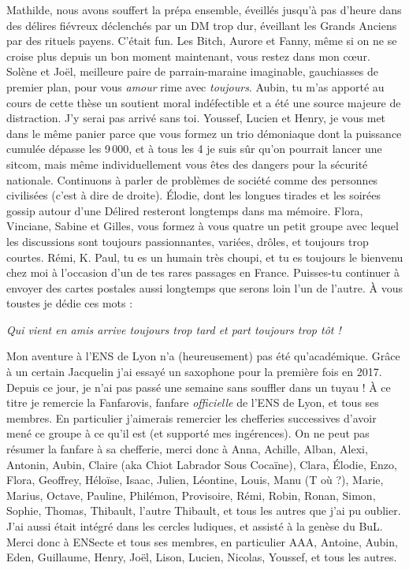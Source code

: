 Mathilde, nous avons souffert la prépa ensemble, éveillés jusqu'à pas d'heure dans des délires fiévreux déclenchés par un DM trop dur, éveillant les Grands Anciens par des rituels payens. C'était fun.
Les Bitch, Aurore et Fanny, même si on ne se croise plus depuis un bon moment maintenant, vous restez dans mon cœur.
Solène et Joël, meilleure paire de parrain-maraine imaginable, gauchiasses de premier plan, pour vous \textit{amour} rime avec \textit{toujours}.
Aubin, tu m'as apporté au cours de cette thèse un soutient moral indéfectible et a été une source majeure de distraction. J'y serai pas arrivé sans toi.
Youssef, Lucien et Henry, je vous met dans le même panier parce que vous formez un trio démoniaque dont la puissance cumulée dépasse les 9\,000, et à tous les 4 je suis sûr qu'on pourrait lancer une sitcom, mais même individuellement vous êtes des dangers pour la sécurité nationale. Continuons à parler de problèmes de société comme des personnes civilisées (c'est à dire de droite).
Élodie, dont les longues tirades et les soirées gossip autour d'une Délired resteront longtemps dans ma mémoire.
Flora, Vinciane, Sabine et Gilles, vous formez à vous quatre un petit groupe avec lequel les discussions sont toujours passionnantes, variées, drôles, et toujours trop courtes.
Rémi, K.
Paul, tu es un humain très choupi, et tu es toujours le bienvenu chez moi à l'occasion d'un de tes rares passages en France. Puisses-tu continuer à envoyer des cartes postales aussi longtemps que serons loin l'un de l'autre. À vous toustes je dédie ces mots :

\begin{flushright}
\textit{Qui vient en amis arrive toujours trop tard et part toujours trop tôt !}
\end{flushright}



\vskip 1cm


Mon aventure à l'ENS de Lyon n'a (heureusement) pas été qu'académique. Grâce à un certain Jacquelin j'ai essayé un saxophone pour la première fois en 2017. Depuis ce jour, je n'ai pas passé une semaine sans souffler dans un tuyau ! À ce titre je remercie la Fanfarovis, fanfare \textit{officielle} de l'ENS de Lyon, et tous ses membres. En particulier j'aimerais remercier les chefferies successives d'avoir mené ce groupe à ce qu'il est (et supporté mes ingérences). On ne peut pas résumer la fanfare à sa chefferie, merci donc à
Anna,
Achille,
Alban,
Alexi,
Antonin,
Aubin,
Claire (aka Chiot Labrador Sous Cocaïne),
Clara,
Élodie,
Enzo,
Flora,
Geoffrey,
Héloïse,
Isaac,
Julien,
Léontine,
Louis,
Manu (T où ?),
Marie,
Marius,
Octave,
Pauline,
Philémon,
Provisoire,
Rémi,
Robin,
Ronan,
Simon,
Sophie,
Thomas,
Thibault,
l'autre Thibault,
et tous les autres que j'ai pu oublier. J'ai aussi était intégré dans les cercles ludiques, et assisté à la genèse du BuL. Merci donc à ENSecte et tous ses membres, en particulier
AAA,
Antoine,
Aubin,
Eden,
Guillaume,
Henry,
Joël,
Lison,
Lucien,
Nicolas,
Youssef,
et tous les autres.


